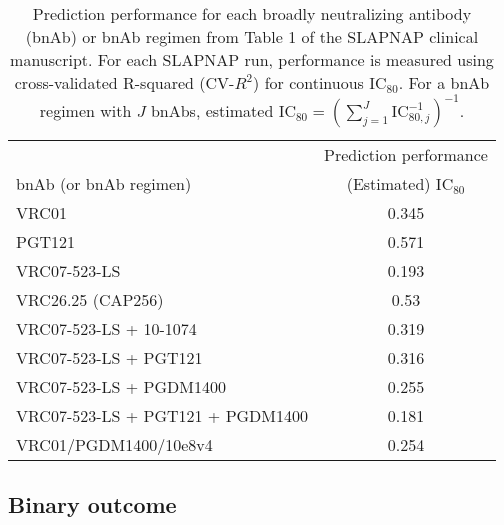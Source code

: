 \documentclass[10pt]{article}
\begin{document}
\begin{table}
    \centering
    \caption{Prediction performance for each broadly neutralizing antibody (bnAb) or bnAb regimen from Table 1 of the SLAPNAP clinical manuscript. For each SLAPNAP run, performance is measured using cross-validated R-squared (CV-$R^2$) for continuous IC$_{80}$. For a bnAb regimen with $J$ bnAbs, estimated $\text{IC}_{80} = \left(\sum_{j=1}^J \text{IC}_{80,j}^{-1}\right)^{-1}$.}
    \begin{tabular}{l|c}
        & \multicolumn{1}{c}{Prediction performance} \\
        bnAb (or bnAb regimen) & (Estimated) IC$_{80}$ \\
        \hline
        VRC01 & 0.345  \\
        PGT121 & 0.571 \\
        VRC07-523-LS & 0.193 \\
        VRC26.25 (CAP256) & 0.53 \\
        VRC07-523-LS + 10-1074 & 0.319 \\
        VRC07-523-LS + PGT121 & 0.316 \\
        VRC07-523-LS + PGDM1400 & 0.255 \\
        VRC07-523-LS + PGT121 + PGDM1400 & 0.181 \\
        VRC01/PGDM1400/10e8v4 & 0.254
    \end{tabular}
    \label{tab:perf-continuous}
\end{table}

\subsection*{Binary outcome}
\end{document}

